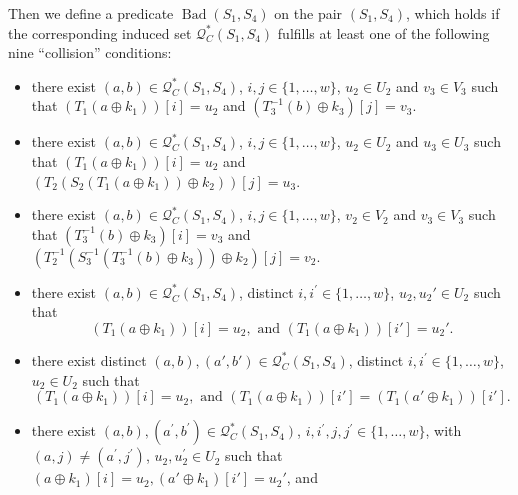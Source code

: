 \begin{definition}
	\label{defn:bad-outer-4-rounds}
	
	Then we define a predicate $\operatorname{Bad}\left(S_{1},S_{4}\right)$ on the pair $(S_1, S_4)$, which holds if the corresponding induced set $\mathcal{Q}_{C}^{*}\left(S_{1}, S_{4}\right)$ fulfills at least one of the following nine ``collision'' conditions:
	\begin{itemize}
		\item[\cone]
		there exist $(a, b) \in \mathcal{Q}_{C}^{*}\left(S_{1}, S_{4}\right)$, $i, j \in\{1, \ldots, w\}$, $u_{2} \in U_{2}$ and $v_{3} \in V_{3}$ such that $\left(T_1\left(a \oplus k_{1}\right)\right)[i] = u_2$ and $\left(T_{3}^{-1}\left(b\right) \oplus k_{3}\right)[j] = v_3$.
		\item[\ctwo]
		there exist $(a, b) \in \mathcal{Q}_{C}^{*}\left(S_{1}, S_{4}\right)$, $i, j \in\{1, \ldots, w\}$, $u_{2} \in U_{2}$ and $u_{3} \in U_{3}$ such that $\left(T_1\left(a \oplus k_{1}\right)\right)[i] = u_2$ and $\left(T_{2}\left(S_{2}\left(T_1\left(a \oplus k_{1}\right)\right) \oplus k_{2}\right)\right)[j] = u_3$.
		\item[\cthree]
		there exist $(a, b) \in \mathcal{Q}_{C}^{*}\left(S_{1}, S_{4}\right)$, $i, j \in\{1, \ldots, w\}$, $v_{2} \in V_{2}$ and $v_{3} \in V_{3}$ such that $\left(T_{3}^{-1}\left(b\right) \oplus k_{3}\right)[i] = v_3$ and $\left(T_{2}^{-1}\left(S_{3}^{-1}\left(T_{3}^{-1}\left(b\right) \oplus k_{3}\right)\right) \oplus k_{2}\right)[j] = v_2$.
		\item[\cfour]
		there exist $(a, b) \in \mathcal{Q}_{C}^{*}\left(S_{1}, S_{4}\right)$, distinct $i, i^{\prime}\in\{1, \ldots, w\}$, $u_{2},u_{2}' \in U_{2}$ such that
		$$\left(T_1\left(a \oplus k_{1}\right)\right)[i] = u_2,\text{ and }
		\left(T_1\left(a \oplus k_{1}\right)\right)[i'] = u_2'.$$
		\item[\cfive]
		there exist distinct $(a, b),(a',b') \in \mathcal{Q}_{C}^{*}\left(S_{1}, S_{4}\right)$, distinct $i, i^{\prime}\in\{1, \ldots, w\}$, $u_{2} \in U_{2}$ such that
		$$\left(T_1\left(a \oplus k_{1}\right)\right)[i] = u_2,\text{ and }
		\left(T_1\left(a \oplus k_{1}\right)\right)[i'] = \left(T_1\left(a' \oplus k_{1}\right)\right)[i'].$$
		\item[\csix]
		there exist $(a, b), (a^{\prime}, b^{\prime}) \in \mathcal{Q}_{C}^{*}\left(S_{1}, S_{4}\right)$, $i, i^{\prime},j, j^{\prime} \in\{1, \ldots, w\}$, with $(a, j) \neq \left(a^{\prime}, j^{\prime}\right)$, $u_{2}, u_{2}^{\prime} \in U_{2}$ such that $(a \oplus k_1)[i] = u_2, (a' \oplus k_1)[i'] = u_2'$, and

\end{itemize}
\end{definition}
